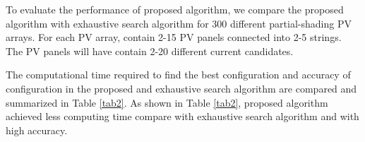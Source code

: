 \documentclass[conference]{IEEEtran}
\begin{document}


To evaluate the performance of proposed algorithm, we compare the proposed algorithm with exhaustive search algorithm for 300 different partial-shading PV arrays. For each PV array, contain 2-15 PV panels connected into 2-5 strings. The PV panels will have contain 2-20 different current candidates. 



The computational time required to find the best configuration and accuracy of configuration in the proposed and exhaustive search algorithm are compared and summarized in Table \ref{tab2}. As shown in Table \ref{tab2}, proposed algorithm achieved less computing time compare with exhaustive search algorithm and with high accuracy.
\end{document}
